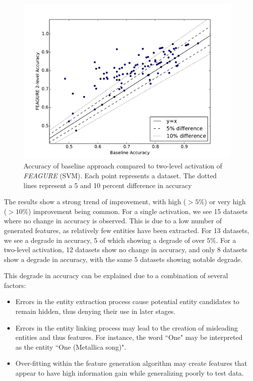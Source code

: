 \documentclass[twoside,11pt]{article}
\theoremstyle{definition}
\begin{document}
\begin{figure}
	\centering
	\includegraphics[width=0.7\linewidth]{svm_full_lvl2}
	\caption{Accuracy of
		baseline approach compared to two-level activation of \emph{FEAGURE} (SVM). Each point represents a dataset. The dotted lines represent a 5 and 10 percent difference in accuracy}
	\label{fig:svm_base_lvl2}
\end{figure}

The results show a strong trend of improvement, with high ($> 5\%$) or very high ($>10\%$) improvement being common.
For a single activation, we see 15 datasets where no change in accuracy is observed. This is due to a low number of generated features, as relatively few entities have been extracted. For 13 datasets, we see a degrade in accuracy, 5 of which showing  a degrade of over $5\%$.
For a two-level activation, 12 datasets show no change in accuracy, and only 8 datasets show a degrade in accuracy, with the same 5 datasets showing notable degrade.

This degrade in accuracy can be explained due to a combination of several factors:
\begin{itemize}
	\item Errors in the entity extraction process cause potential entity candidates to remain hidden, thus denying their use in later stages.
	\item Errors in the entity linking process may lead to the creation of misleading entities and thus features. For instance, the word ``One" may be interpreted as the entity ``One (Metallica song)".
	\item Over-fitting within the feature generation algorithm may create features that appear to have high information gain while generalizing poorly to test data.
\end{itemize} 
\end{document}
